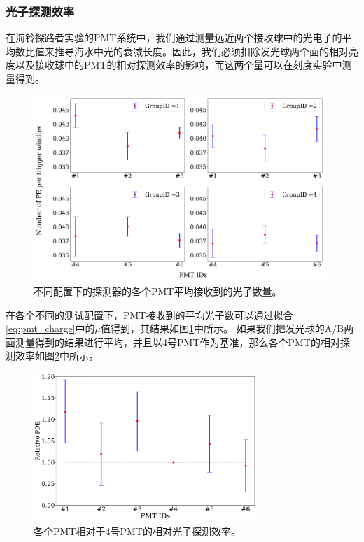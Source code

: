 \subsubsection{光子探测效率}

在海铃探路者实验的PMT系统中，我们通过测量远近两个接收球中的光电子的平均数比值来推导海水中光的衰减长度。因此，我们必须扣除发光球两个面的相对亮度以及接收球中的PMT的相对探测效率的影响，而这两个量可以在刻度实验中测量得到。

\begin{figure}[ht]
    \centering
    \includegraphics[width = 0.98\textwidth]{img/pmt_relative_photon_efficiency.pdf}
    \caption{不同配置下的探测器的各个PMT平均接收到的光子数量。}
    \label{fig:pmt_relative_photon_efficiency}
\end{figure}

在各个不同的测试配置下，PMT接收到的平均光子数可以通过拟合\ref{eq:pmt_charge}中的$\mu$值得到，其结果如图\ref{fig:pmt_relative_photon_efficiency}中所示。
如果我们把发光球的A/B两面测量得到的结果进行平均，并且以4号PMT作为基准，那么各个PMT的相对探测效率如图\ref{fig:pmt_relative_detection_eff_ave}中所示。

\begin{figure}[!ht]
    \centering
    \includegraphics[width = 0.75\textwidth]{img/pmt_relative_detection_eff_ave.pdf}
    \caption{各个PMT相对于4号PMT的相对光子探测效率。}
    \label{fig:pmt_relative_detection_eff_ave}
\end{figure}

